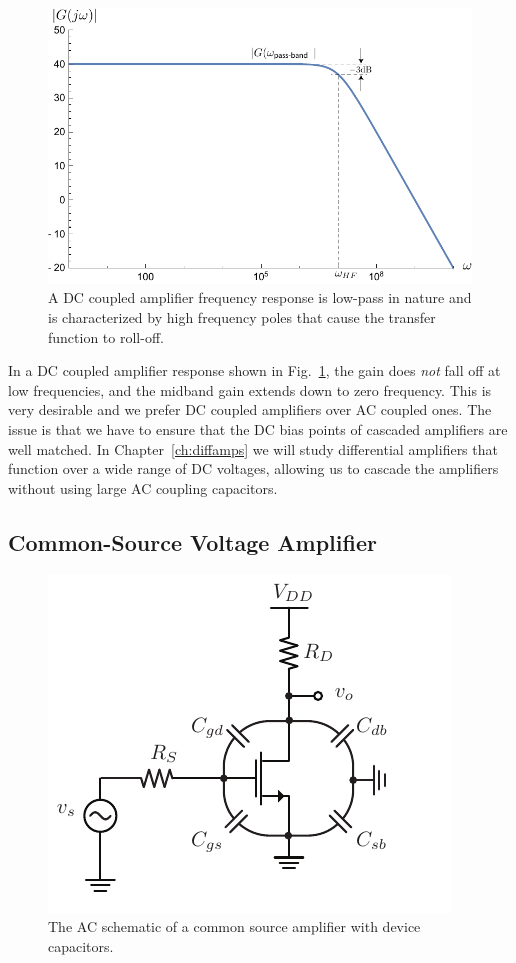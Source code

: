 \begin{figure}[tb]
\begin{center}
\includegraphics[width=.75\columnwidth]{amp_dccoup} 
\end{center}
\caption{A DC coupled amplifier frequency response is low-pass in nature and is characterized by high frequency poles that cause the transfer function to roll-off.} \label{fig:amp_dccoup}
\end{figure}



In a DC coupled amplifier response shown in Fig.~\ref{fig:amp_dccoup}, the gain does \textit{not} fall off at low frequencies, and the midband gain extends down to zero frequency. This is very desirable and we prefer DC coupled amplifiers over AC coupled ones.  The issue is that we have to ensure that the DC bias points of cascaded amplifiers are well matched.  In Chapter~\ref{ch:diffamps} we will study differential amplifiers that function over a wide range of DC voltages, allowing us to cascade the amplifiers without using large AC coupling capacitors.
 





\subsection{Common-Source Voltage Amplifier}


\begin{figure}[tb]
\begin{center}
\includegraphics[scale=1]{cs_amp_caps}
\end{center}
\caption{The AC schematic of a common source amplifier with device capacitors.} \label{fig:cs_amp_caps}
\end{figure}

